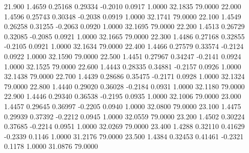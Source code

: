   21.900   1.4659   0.25168   0.29334  -0.2010   0.0917   1.0000  32.1835  79.0000
  22.000   1.4596   0.25743   0.30348  -0.2038   0.0919   1.0000  32.1741  79.0000
  22.100   1.4549   0.26258   0.31255  -0.2063   0.0920   1.0000  32.1695  79.0000
  22.200   1.4513   0.26729   0.32085  -0.2085   0.0921   1.0000  32.1665  79.0000
  22.300   1.4486   0.27168   0.32855  -0.2105   0.0921   1.0000  32.1634  79.0000
  22.400   1.4466   0.27579   0.33574  -0.2124   0.0922   1.0000  32.1590  79.0000
  22.500   1.4451   0.27967   0.34247  -0.2141   0.0924   1.0000  32.1525  79.0000
  22.600   1.4443   0.28335   0.34881  -0.2157   0.0926   1.0000  32.1438  79.0000
  22.700   1.4439   0.28686   0.35475  -0.2171   0.0928   1.0000  32.1324  79.0000
  22.800   1.4440   0.29020   0.36028  -0.2184   0.0931   1.0000  32.1180  79.0000
  22.900   1.4446   0.29340   0.36538  -0.2195   0.0935   1.0000  32.1006  79.0000
  23.000   1.4457   0.29645   0.36997  -0.2205   0.0940   1.0000  32.0800  79.0000
  23.100   1.4475   0.29939   0.37392  -0.2212   0.0945   1.0000  32.0559  79.0000
  23.200   1.4502   0.30224   0.37685  -0.2214   0.0951   1.0000  32.0269  79.0000
  23.400   1.4288   0.32110   0.41629  -0.2339   0.1146   1.0000  31.2176  79.0000
  23.500   1.4384   0.32453   0.41461  -0.2321   0.1178   1.0000  31.0876  79.0000
